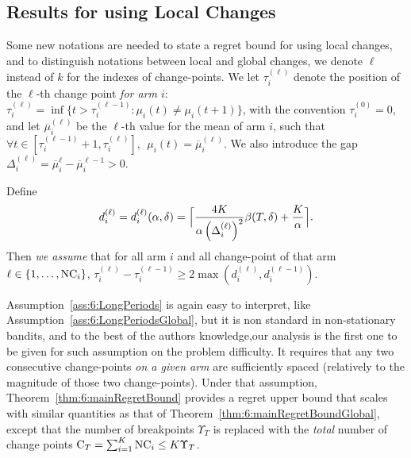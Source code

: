 \subsection{Results for \GLRklUCB{} using Local Changes}

Some new notations are needed to state a regret bound for \GLRklUCB{} using local changes,
and to distinguish notations between local and global changes, we denote $\ell$ instead of $k$ for the indexes of change-points.
We let $\tau_i^{(\ell)}$ denote the position of the $\ell$-th change point \emph{for arm $i$}: $\tau_i^{(\ell)} = \inf \{ t > \tau_i^{(\ell - 1)} : \mu_i(t) \neq \mu_i(t+1)\}$,
with the convention $\tau_i^{(0)}=0$, and let $\overline{\mu}_i^{(\ell)}$ be the $\ell$-th value for the mean of arm $i$, such that $\forall t \in [\tau_i^{(\ell-1)}+1, \tau_i^{(\ell)}], \ \ \mu_i(t) = \overline{\mu}_i^{(\ell)}$.
We also introduce the gap $\Delta_i^{(\ell)} = \overline{\mu}_i^{\ell} - \overline{\mu}_i^{\ell-1} > 0$.

\begin{assumption}\label{ass:6:LongPeriods}
\begin{leftbar}[assumptionbar]  %
    Define
    \begin{equation}\label{def:6:DelayLocal}
        d_i^{(\ell)} = d_i^{(\ell)}(\alpha,\delta) = \Bigl\lceil \frac{4K}{\alpha\left(\Delta_i^{(\ell)}\right)^2}\beta(T,\delta) + \frac{K}{\alpha} \Bigr\rceil.
    \end{equation}
    Then \emph{we assume} that for all arm $i$ and all change-point of that arm $\ell \in \{1,\dots,\text{NC}_i\}$, $\tau_i^{(\ell)} - \tau_i^{(\ell-1)} \geq 2\max (d_i^{(\ell)},d_i^{(\ell-1)})$.
\end{leftbar}  %
\end{assumption}

Assumption~\ref{ass:6:LongPeriods} is again easy to interpret, like Assumption~\ref{ass:6:LongPeriodsGlobal}, but it is non standard in non-stationary bandits, and to the best of the authors knowledge,our analysis is the first one to be given for such assumption on the problem difficulty.
%
It requires that any two consecutive change-points \emph{on a given arm} are sufficiently spaced (relatively to the magnitude of those two change-points). Under that assumption, Theorem~\ref{thm:6:mainRegretBound} provides a regret upper bound that scales with similar quantities as that of Theorem~\ref{thm:6:mainRegretBoundGlobal}, except that the number of breakpoints $\Upsilon_T$ is replaced with the \emph{total} number of change points $\mathrm{C}_T = \sum_{i=1}^K \text{NC}_i \leq K \Upsilon_T$.


